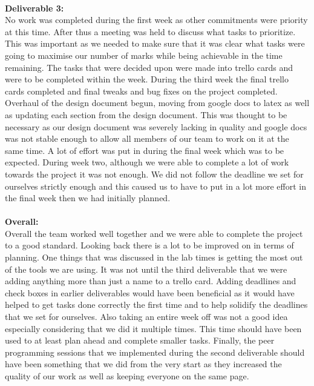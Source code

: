 \\
\textbf{Deliverable 3:\\}
No work was completed during the first week as other commitments were priority at this time. After thus a meeting was held to discuss what tasks to prioritize. This was important as we needed to make sure that it was clear what tasks were going to maximise our number of marks while being achievable in the time remaining. The tasks that were decided upon were made into trello cards and were to be completed within the week. During the third week the final trello cards completed and final tweaks and bug fixes on the project completed. Overhaul of the design document begun, moving from google docs to latex as well as updating each section from the design document. This was thought to be necessary as our design document was severely lacking in quality and google docs was not stable enough to allow all members of our team to work on it at the same time. A lot of effort was put in during the final week which was to be expected. During week two, although we were able to complete a lot of work towards the project it was not enough. We did not follow the deadline we set for ourselves strictly enough and this caused us to have to put in a lot more effort in the final week then we had initially planned.  \\
\\
\textbf{Overall:\\}
Overall the team worked well together and we were able to complete the project to a good standard. Looking back there is a lot to be improved on in terms of planning. One things that was discussed in the lab times is getting the most out of the tools we are using. It was not until the third deliverable that we were adding anything more than just a name to a trello card. Adding deadlines and check boxes in earlier deliverables would have been beneficial as it would have helped to get tasks done correctly the first time and to help solidify the deadlines that we set for ourselves. Also taking an entire week off was not a good idea especially considering that we did it multiple times. This time should have been used to at least plan ahead and complete smaller tasks. Finally, the peer programming sessions that we implemented during the second deliverable should have been something that we did from the very start as they increased the quality of our work as well as keeping everyone on the same page.\\
\\
